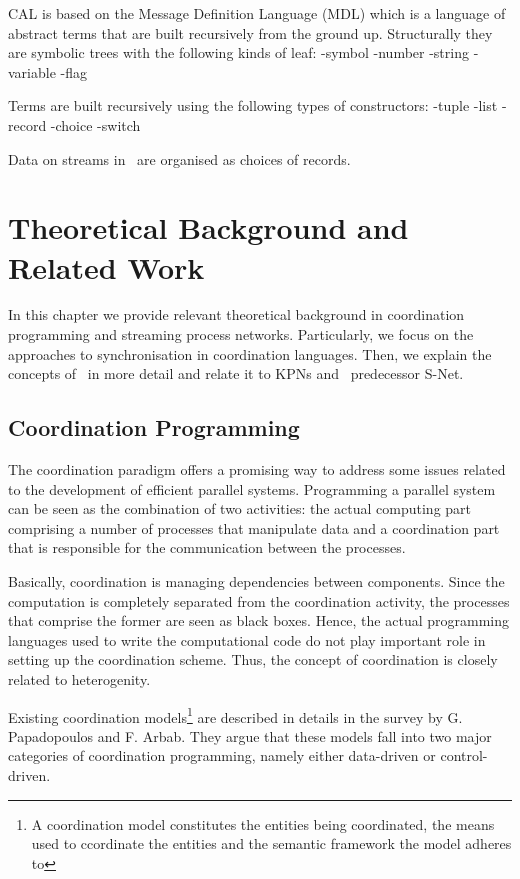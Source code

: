 CAL is based on the Message Definition Language (MDL) which is a language of abstract terms that are built recursively from the ground up. Structurally they are symbolic trees with the following kinds of leaf:
-symbol
-number
-string
-variable
-flag

Terms are built recursively using the following types of constructors:
-tuple
-list
-record
-choice
-switch


Data on streams in \ak\ are organised as choices of records.



\chapter{Theoretical Background and Related Work}
In this chapter we provide relevant theoretical background in coordination programming and streaming process networks. Particularly, we focus on the approaches to synchronisation in coordination languages. Then, we explain the concepts of \ak\ in more detail and relate it to KPNs and \ak\ predecessor S-Net.



    \section{Coordination Programming}
The coordination paradigm offers a promising way to address some issues related to the development of efficient parallel systems. Programming a parallel system can be seen as the combination of two activities: the actual computing part comprising a number of processes that manipulate data and a coordination part that is responsible for the communication between the processes.

Basically, coordination is managing dependencies between components. Since the computation is completely separated from the coordination activity, the processes that comprise the former are seen as black boxes. Hence, the actual programming languages used to write the computational code do not play important role in setting up the coordination scheme. Thus, the concept of coordination is closely related to heterogenity.

Existing coordination models\footnote{A coordination model constitutes the entities being coordinated, the means used to ccordinate the entities and the semantic framework the model adheres to} are described in details in the survey \cite{papadopoulos} by G. Papadopoulos and F. Arbab. They argue that these models fall into two major categories of coordination programming, namely either data-driven or control-driven.

